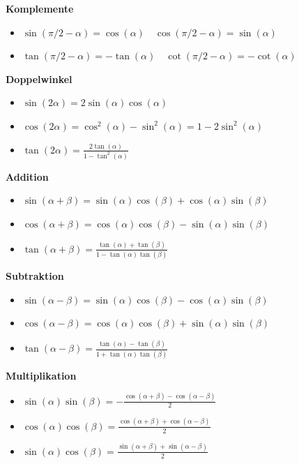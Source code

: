 \begin{flushleft}
\textbf{Komplemente}
\begin{itemize}[leftmargin = *]
 \item $\sin(\pi/2 - \alpha) = \cos(\alpha) \quad \cos(\pi/2 - \alpha) = \sin(\alpha)$
 \item $\tan(\pi/2 - \alpha) = -\tan(\alpha) \quad \cot(\pi/2 - \alpha) = -\cot(\alpha)$
\end{itemize}

\textbf{Doppelwinkel}
\begin{itemize}[leftmargin = *]
 \item $\sin(2\alpha) = 2 \sin(\alpha) \cos(\alpha)$
 \item $\cos(2\alpha) = \cos^2(\alpha) - \sin^2(\alpha) = 1 - 2 \sin^2(\alpha)$
 \item $\tan(2\alpha) = \frac{2\tan(\alpha)}{1 - \tan^2(\alpha)}$
\end{itemize}

\textbf{Addition}
\begin{itemize}[leftmargin = *]
 \item $\sin(\alpha + \beta) = \sin(\alpha) \cos(\beta) + \cos(\alpha) \sin(\beta)$
 \item $\cos(\alpha + \beta) = \cos(\alpha) \cos(\beta) - \sin(\alpha) \sin(\beta)$
 \item $\tan(\alpha + \beta) = \frac{\tan(\alpha) + \tan(\beta)}{1 - \tan(\alpha) \tan(\beta)}$
\end{itemize}

\textbf{Subtraktion}
\begin{itemize}[leftmargin = *]
 \item $\sin(\alpha - \beta) = \sin(\alpha) \cos(\beta) - \cos(\alpha)\sin(\beta)$
 \item $\cos(\alpha - \beta) = \cos(\alpha) \cos(\beta) + \sin(\alpha)\sin(\beta)$
 \item $\tan(\alpha - \beta) = \frac{\tan(\alpha) - \tan(\beta)}{1+\tan(\alpha) \tan(\beta)}$
\end{itemize}

\textbf{Multiplikation}
\begin{itemize}[leftmargin = *]
 \item $\sin(\alpha) \sin(\beta) = -\frac{\cos(\alpha + \beta) - \cos(\alpha - \beta)}{2}$
 \item $\cos(\alpha) \cos(\beta) =  \frac{\cos(\alpha + \beta) + \cos(\alpha - \beta)}{2}$
 \item $\sin(\alpha) \cos(\beta) =  \frac{\sin(\alpha + \beta) + \sin(\alpha - \beta)}{2}$
\end{itemize}


\end{flushleft}

